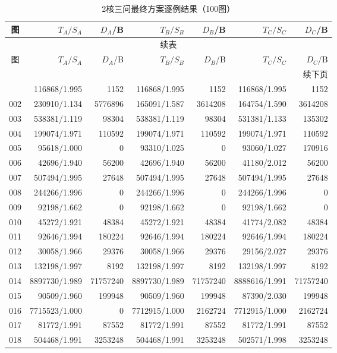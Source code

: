 \begin{longtable}{crrrrrr}
\caption{2核三问最终方案逐例结果（100图）}\label{tab:v7-detail-2}\\
\toprule
图 & $T_A/S_A$ & $D_A$/B & $T_B/S_B$ & $D_B$/B & $T_C/S_C$ & $D_C$/B \\
\midrule
\endfirsthead
\multicolumn{7}{c}{续表}\\
\toprule
图 & $T_A/S_A$ & $D_A$/B & $T_B/S_B$ & $D_B$/B & $T_C/S_C$ & $D_C$/B \\
\midrule
\endhead
\midrule\multicolumn{7}{r}{续下页}\\
\endfoot
\bottomrule
\endlastfoot
001 & 116868/1.995 & 1152 & 116868/1.995 & 1152 & 116868/1.995 & 1152 \\
002 & 230910/1.134 & 5776896 & 165091/1.587 & 3614208 & 164754/1.590 & 3614208 \\
003 & 538381/1.119 & 98304 & 538381/1.119 & 98304 & 531381/1.133 & 135302 \\
004 & 199074/1.971 & 110592 & 199074/1.971 & 110592 & 199074/1.971 & 110592 \\
005 & 95618/1.000 & 0 & 93310/1.025 & 0 & 93060/1.027 & 170916 \\
006 & 42696/1.940 & 56200 & 42696/1.940 & 56200 & 41180/2.012 & 56200 \\
007 & 507494/1.995 & 27648 & 507494/1.995 & 27648 & 507494/1.995 & 27648 \\
008 & 244266/1.996 & 0 & 244266/1.996 & 0 & 244266/1.996 & 0 \\
009 & 92198/1.662 & 0 & 92198/1.662 & 0 & 92198/1.662 & 0 \\
010 & 45272/1.921 & 48384 & 45272/1.921 & 48384 & 41774/2.082 & 48384 \\
011 & 92646/1.994 & 180224 & 92646/1.994 & 180224 & 92646/1.994 & 180224 \\
012 & 30058/1.966 & 29376 & 30058/1.966 & 29376 & 29156/2.027 & 29376 \\
013 & 132198/1.997 & 8192 & 132198/1.997 & 8192 & 132198/1.997 & 8192 \\
014 & 8897730/1.989 & 71757240 & 8897730/1.989 & 71757240 & 8888616/1.991 & 71757240 \\
015 & 90509/1.960 & 199948 & 90509/1.960 & 199948 & 87390/2.030 & 199948 \\
016 & 7715523/1.000 & 0 & 7712915/1.000 & 2162724 & 7712915/1.000 & 2162724 \\
017 & 81772/1.991 & 87552 & 81772/1.991 & 87552 & 81772/1.991 & 87552 \\
018 & 504468/1.991 & 3253248 & 504468/1.991 & 3253248 & 502571/1.998 & 3253248 \\

\end{longtable}
